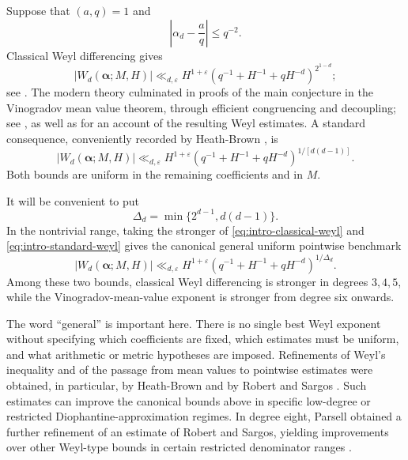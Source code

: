 \documentclass[11pt,reqno]{amsart}
\numberwithin{equation}{section}
\theoremstyle{definition}
\theoremstyle{remark}
\begin{document}
Suppose that $(a,q)=1$ and
\[
  \left|\alpha_d-\frac aq\right|\le q^{-2}.
\]
Classical Weyl differencing gives
\begin{equation}\label{eq:intro-classical-weyl}
  |W_d(\boldsymbol\alpha;M,H)|
  \ll_{d,\varepsilon}
  H^{1+\varepsilon}
  \left(q^{-1}+H^{-1}+qH^{-d}\right)^{2^{1-d}};
\end{equation}
see \cite{Vaughan1997}.  The modern theory culminated in proofs of the main
conjecture in the Vinogradov mean value theorem, through efficient
congruencing and decoupling; see
\cite{Wooley2012,BourgainDemeterGuth2016,Wooley2019}, as well as
\cite{Bourgain2017} for an account of the resulting Weyl estimates.  A
standard consequence, conveniently recorded by Heath-Brown
\cite{HeathBrown2017}, is
\begin{equation}\label{eq:intro-standard-weyl}
  |W_d(\boldsymbol\alpha;M,H)|
  \ll_{d,\varepsilon}
  H^{1+\varepsilon}
  \left(q^{-1}+H^{-1}+qH^{-d}\right)^{1/[d(d-1)]}.
\end{equation}
Both bounds are uniform in the remaining coefficients and in $M$.

It will be convenient to put
\begin{equation}\label{eq:Delta-definition}
  \Delta_d=\min\{2^{d-1},d(d-1)\}.
\end{equation}
In the nontrivial range, taking the stronger of
\eqref{eq:intro-classical-weyl} and \eqref{eq:intro-standard-weyl} gives the
canonical general uniform pointwise benchmark
\begin{equation}\label{eq:intro-generic-weyl}
  |W_d(\boldsymbol\alpha;M,H)|
  \ll_{d,\varepsilon}
  H^{1+\varepsilon}
  \left(q^{-1}+H^{-1}+qH^{-d}\right)^{1/\Delta_d}.
\end{equation}
Among these two bounds, classical Weyl differencing is stronger in degrees
$3,4,5$, while the Vinogradov-mean-value exponent is stronger from degree
six onwards.

The word ``general'' is important here.  There is no single best Weyl
exponent without specifying which coefficients are fixed, which estimates
must be uniform, and what arithmetic or metric hypotheses are imposed.
Refinements of Weyl's inequality and of the passage from mean values to
pointwise estimates were obtained, in particular, by Heath-Brown and by
Robert and Sargos \cite{HeathBrown1988,RobertSargos2000,HeathBrown2017}.
Such estimates can improve the canonical bounds above in specific low-degree
or restricted Diophantine-approximation regimes.  In degree eight, Parsell
obtained a further refinement of an estimate of Robert and Sargos, yielding
improvements over other Weyl-type bounds in certain restricted denominator
ranges \cite{Parsell2014}.
\end{document}
